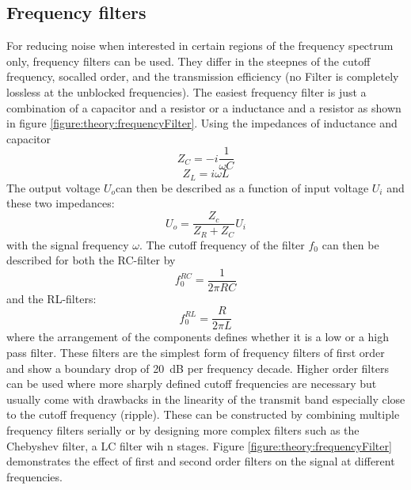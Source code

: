             \subsection{Frequency filters}
                For reducing noise when interested in certain regions of the frequency spectrum only, frequency filters can be used. They differ in the steepnes of the cutoff frequency, socalled order, and the transmission efficiency (no Filter is completely lossless at the unblocked frequencies). The easiest frequency filter is just a combination of a capacitor and a resistor or a inductance and a resistor as shown in figure \ref{figure:theory:frequencyFilter}. Using the impedances of inductance and capacitor
                \begin{equation*}
                    Z_C = -i\frac{1}{\omega C}
                \end{equation*}
                \begin{equation*}
                    Z_L = {i\omega L}
                \end{equation*} 
                The output voltage $U_o$can then be described as a function of input voltage $U_{i}$ and these two impedances:
                \begin{equation}
                    U_o = \frac{Z_c}{Z_R + Z_C} U_i
                \end{equation}
                with the signal frequency $\omega$. The cutoff frequency of the filter $f_0$ can then be described for both the RC-filter by
                \begin{equation}
                    f_0^{RC} = \frac{1}{2\pi R C}
                \end{equation}
                and the RL-filters:
                \begin{equation}
                    f_0^{RL} = \frac{R}{2\pi L}
                \end{equation}
                where the arrangement of the components defines whether it is a low or a high pass filter. These filters are the simplest form of frequency filters of first order and show a boundary drop of \SI{20}{\deci\bel} per frequency decade. Higher order filters can be used where more sharply defined cutoff frequencies are necessary but usually come with drawbacks in the linearity of the transmit band especially close to the cutoff frequency (ripple). These can be constructed by combining multiple frequency filters serially or by designing more complex filters such as the Chebyshev filter, a LC filter wih n stages. Figure \ref{figure:theory:frequencyFilter} demonstrates the effect of first and second order filters on the signal at different frequencies.
